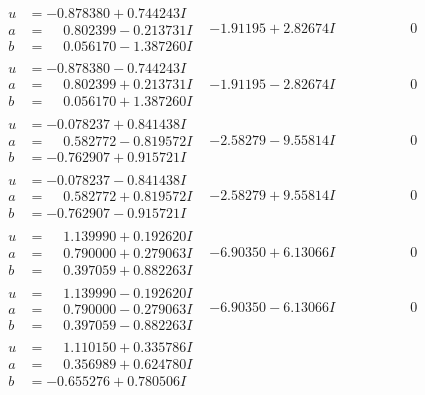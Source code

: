 \documentclass[1p]{elsarticle_modified}
\theoremstyle{definition}
\begin{document}
$$\begin{array}{c|c|c}
\begin{aligned}
u &= -0.878380 + 0.744243 I \\
a &= \phantom{-}0.802399 - 0.213731 I \\
b &= \phantom{-}0.056170 - 1.387260 I\end{aligned}
 & -1.91195 + 2.82674 I & \phantom{-0.000000 } 0 \\ \hline\begin{aligned}
u &= -0.878380 - 0.744243 I \\
a &= \phantom{-}0.802399 + 0.213731 I \\
b &= \phantom{-}0.056170 + 1.387260 I\end{aligned}
 & -1.91195 - 2.82674 I & \phantom{-0.000000 } 0 \\ \hline\begin{aligned}
u &= -0.078237 + 0.841438 I \\
a &= \phantom{-}0.582772 - 0.819572 I \\
b &= -0.762907 + 0.915721 I\end{aligned}
 & -2.58279 - 9.55814 I & \phantom{-0.000000 } 0 \\ \hline\begin{aligned}
u &= -0.078237 - 0.841438 I \\
a &= \phantom{-}0.582772 + 0.819572 I \\
b &= -0.762907 - 0.915721 I\end{aligned}
 & -2.58279 + 9.55814 I & \phantom{-0.000000 } 0 \\ \hline\begin{aligned}
u &= \phantom{-}1.139990 + 0.192620 I \\
a &= \phantom{-}0.790000 + 0.279063 I \\
b &= \phantom{-}0.397059 + 0.882263 I\end{aligned}
 & -6.90350 + 6.13066 I & \phantom{-0.000000 } 0 \\ \hline\begin{aligned}
u &= \phantom{-}1.139990 - 0.192620 I \\
a &= \phantom{-}0.790000 - 0.279063 I \\
b &= \phantom{-}0.397059 - 0.882263 I\end{aligned}
 & -6.90350 - 6.13066 I & \phantom{-0.000000 } 0 \\ \hline\begin{aligned}
u &= \phantom{-}1.110150 + 0.335786 I \\
a &= \phantom{-}0.356989 + 0.624780 I \\
b &= -0.655276 + 0.780506 I\end{aligned}

\end{array}$$
\end{document}
